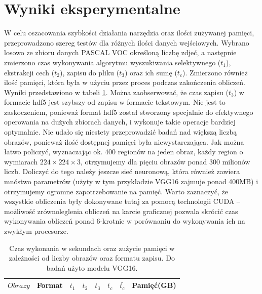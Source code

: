 \documentclass[a4paper,twoside,12pt]{book}
\begin{document}
{\section{Wyniki eksperymentalne}
{W celu oszacowania szybkości działania narzędzia oraz ilości zużywanej pamięci, przeprowadzono szereg testów dla różnych ilości danych wejściowych. Wybrano losowo ze zbioru danych PASCAL VOC określoną liczbę zdjeć, a następnie zmierzono czas wykonywania algorytmu wyszukiwania selektywnego ($t_1$), ekstrakcji cech  ($t_2$), zapisu do pliku ($ t_3$) oraz ich sumę  ($ t_c$). Zmierzono również ilość pamięci, która była w użyciu przez proces podczas zakończenia obliczeń. Wyniki przedstawiono w tabeli \ref{wyniki}. }
{Można zaobserwować, że czas zapisu ($t_3$) w formacie hdf5 jest szybszy od zapisu w formacie tekstowym. Nie jest to zaskoczeniem, ponieważ format hdf5 został stworzony specjalnie do efektywnego operowania na dużych zbiorach danych, i wykonuje takie operacje bardziej optymalnie. Nie udało się niestety przeprowadzić badań nad większą liczbą obrazów, ponieważ ilość dostępnej pamięci była niewystarczająca. Jak można łatwo policzyć, wyznaczając ok. 400 regionów na jeden obraz, każdy region o wymiarach $224\times224\times3$, otrzymujemy dla pięciu obrazów ponad 300 milionów liczb. Doliczyć do tego należy jeszcze sieć neuronową, która również zawiera mnóstwo parametrów (użyty w tym przykładzie VGG16 zajmuje ponad 400MB) i otrzymujemy ogromne zapotrzebowanie na pamięć. Warto zaznaczyć, że wszystkie obliczenia były dokonywane tutaj za pomocą technologii CUDA – możliwość zrównoleglenia obliczeń na karcie graficznej pozwala skrócić czas wykonywania obliczeń ponad 6-krotnie w porównaniu do wykonywania ich na zwykłym procesorze.}
\begin{table}[h!]
\centering
\caption{Czas wykonania w sekundach oraz zużycie pamięci w zależności od liczby obrazów oraz formatu zapisu. Do badań użyto modelu VGG16.}
\label{wyniki}
\begin{tabular}{|c|ccccccc|}
\toprule	
	$Obrazy $ &Format &       $t_1$ & $t_2$ & $t_3$ & $t_c$& $\bar{t_c}$ & Pamięć(GB) \\
\midrule  


\end{tabular}
\end{table}}
\end{document}
